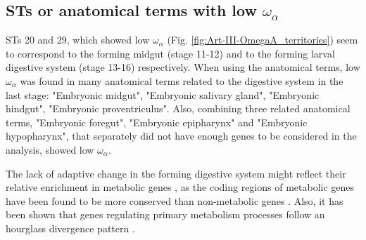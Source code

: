 \subsection{STs or anatomical terms with low {\large$\omega_{\alpha}$}}
\label{embryo_low_Omega}
STs 20 and 29, which showed low $\omega_{\alpha}$ (Fig. \ref{fig:Art-III-OmegaA_territories}) seem to correspond to the forming midgut (stage 11-12) and to the forming larval digestive system (stage 13-16) respectively.
When using the anatomical terms, low $\omega_{\alpha}$ was found in many anatomical terms related to the digestive system in the last stage: "Embryonic midgut", "Embryonic salivary gland", "Embryonic hindgut", "Embryonic proventriculus". 
Also, combining three related anatomical terms, "Embryonic foregut", "Embryonic epipharynx" and "Embryonic hypopharynx", that separately did not have enough genes to be considered in the analysis, showed low $\omega_{\alpha}$. 

The lack of adaptive change in the forming digestive system might reflect their relative enrichment in metabolic genes \citep{Marianes2013}, as the coding regions of metabolic genes have been found to be more conserved than non-metabolic genes \citep{Peregrin-Alvarez2009}. Also, it has been shown that genes regulating primary metabolism processes follow an hourglass divergence pattern \citep{Kalinka2010}.

